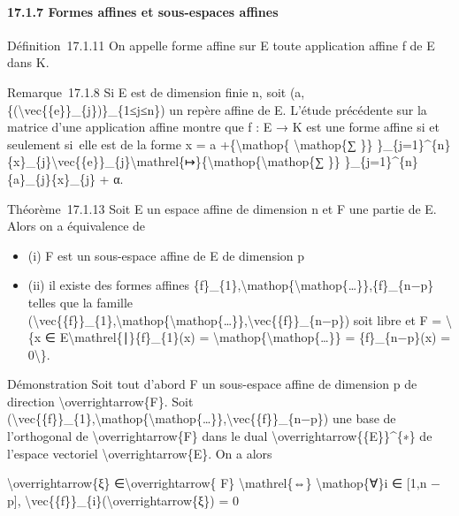 \documentclass[]{article}
\begin{document}
\paragraph{17.1.7 Formes affines et sous-espaces affines}

Définition~17.1.11 On appelle forme affine sur E toute application
affine f de E dans K.

Remarque~17.1.8 Si E est de dimension finie n, soit
(a,\{(\textbackslash{}vec\{\{e\}\}\_\{j\})\}\_\{1≤j≤n\}) un repère
affine de E. L'étude précédente sur la matrice d'une application affine
montre que f : E → K est une forme affine si et seulement si~elle est de
la forme x = a +\{\textbackslash{}mathop\{ \textbackslash{}mathop\{∑
\}\}
\}\_\{j=1\}\^{}\{n\}\{x\}\_\{j\}\textbackslash{}vec\{\{e\}\}\_\{j\}\textbackslash{}mathrel\{↦\}\{\textbackslash{}mathop\{\textbackslash{}mathop\{∑
\}\} \}\_\{j=1\}\^{}\{n\}\{a\}\_\{j\}\{x\}\_\{j\} + α.

Théorème~17.1.13 Soit E un espace affine de dimension n et F une partie
de E. Alors on a équivalence de

\begin{itemize}
\itemsep1pt\parskip0pt
\item
  (i) F est un sous-espace affine de E de dimension p
\item
  (ii) il existe des formes affines
  \{f\}\_\{1\},\textbackslash{}mathop\{\textbackslash{}mathop\{\ldots{}\}\},\{f\}\_\{n−p\}
  telles que la famille
  (\textbackslash{}vec\{\{f\}\}\_\{1\},\textbackslash{}mathop\{\textbackslash{}mathop\{\ldots{}\}\},\textbackslash{}vec\{\{f\}\}\_\{n−p\})
  soit libre et F = \textbackslash{}\{x ∈
  E\textbackslash{}mathrel\{∣\}\{f\}\_\{1\}(x) =
  \textbackslash{}mathop\{\textbackslash{}mathop\{\ldots{}\}\} =
  \{f\}\_\{n−p\}(x) = 0\textbackslash{}\}.
\end{itemize}

Démonstration Soit tout d'abord F un sous-espace affine de dimension p
de direction \textbackslash{}overrightarrow\{F\}. Soit
(\textbackslash{}vec\{\{f\}\}\_\{1\},\textbackslash{}mathop\{\textbackslash{}mathop\{\ldots{}\}\},\textbackslash{}vec\{\{f\}\}\_\{n−p\})
une base de l'orthogonal de \textbackslash{}overrightarrow\{F\} dans le
dual \textbackslash{}overrightarrow\{\{E\}\}\^{}\{∗\} de l'espace
vectoriel \textbackslash{}overrightarrow\{E\}. On a alors

\textbackslash{}overrightarrow\{ξ\} ∈\textbackslash{}overrightarrow\{
F\} \textbackslash{}mathrel\{⇔\} \textbackslash{}mathop\{∀\}i ∈ {[}1,n −
p{]},
\textbackslash{}vec\{\{f\}\}\_\{i\}(\textbackslash{}overrightarrow\{ξ\})
= 0
\end{document}
